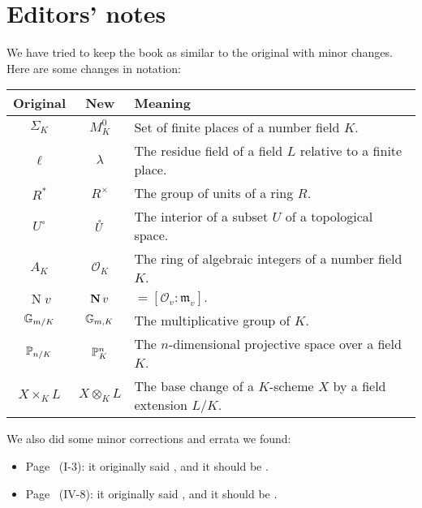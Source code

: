 \chapter*{Editors' notes}
We have tried to keep the book as similar to the original with minor changes.
Here are some changes in notation:
\begin{longtable}{|c|c|p{9cm}|}
	\hline
	\textbf{Original} & \textbf{New} & \textbf{Meaning} \\
	\hline
	\endhead

	\hline
	\endfoot

	$\Sigma_K$ & $M_K^0$ & Set of finite places of a number field $K$. \\
	$\ell$ & $\lambda$ & The residue field of a field $L$ relative to a finite place. \\
	$R^*$ & $R^\times$ & The group of units of a ring $R$. \\
	$U^\circ$ & $\mathring{U}$ & The interior of a subset $U$ of a topological space. \\
	$A_K$ & $\mathcal{O}_K$ & The ring of algebraic integers of a number field $K$. \\
	$\operatorname{N} v$ & $\operatorname{\mathbf{N}} v$ & ${} = [\mathcal{O}_v : \mathfrak{m}_v].$ \\
	$\mathbb{G}_{m/K}$ & $\mathbb{G}_{m, K}$ & The multiplicative group of $K$. \\
	$\mathbb{P}_{n/K}$ & $\mathbb{P}^n_K$ & The $n$-dimensional projective space over a field $K$. \\
	$X \times_K L$ & $X \otimes_K L$ & The base change of a $K$-scheme $X$ by a field extension $L/K$. \\
\end{longtable}

We also did some minor corrections and errata we found:
\begin{itemize}
\item Page~\pageref{errata:t't} (I-3):
	it originally said , and it should be
	.
\item Page~\pageref{errata:uv12} (IV-8):
	it originally said , and it
	should be .
\end{itemize}
